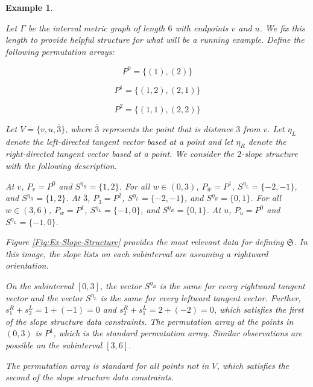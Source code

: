 \documentclass{amsart}
\newtheorem{varexample}[theorem]{Example}
\newenvironment{example}{\begin{varexample}
		\begin{normalfont}}{\end{normalfont}
\end{varexample}}
\begin{document}
	\begin{example}
		\label{Ex:slope-structure}
		Let $\Gamma$ be the interval metric graph of length $6$ with endpoints $v$ and $u$. We fix this length to provide helpful structure for what will be a running example. Define the following permutation arrays:
		
		$$P^0 = \{ (1), (2) \}$$
		
		$$P^1 = \{ (1,2), (2,1) \}$$
		
		$$P^2 = \{ (1,1), (2,2) \}$$
		
		Let $V = \{ v, u, \overline{3} \}$, where $\overline{3}$ represents the point that is distance $3$ from $v$. Let $\eta_{L}$ denote the left-directed tangent vector based at a point and let $\eta_{R}$ denote the right-directed tangent vector based at a point. We consider the $2$-slope structure with the following description.
		
		At $v$, $P_v = P^0$ and $S^{\eta_R} = \{1,2\}$. For all $w \in (0,3)$, $P_{\overline{w}} = P^1$, $S^{\eta_L} = \{-2,-1\}$, and $S^{\eta_R} = \{1,2\}$. At $\overline{3}$, $P_{\overline{3}} = P^2$, $S^{\eta_L} = \{-2,-1\}$, and $S^{\eta_R} = \{0,1\}$. For all $w \in (3,6)$, $P_{\overline{w}} = P^1$, $S^{\eta_L} = \{-1,0\}$, and $S^{\eta_R} = \{0,1\}$. At $u$, $P_u = P^0$ and $S^{\eta_L} = \{-1,0\}$.
		
		Figure \ref{Fig:Ex-Slope-Structure} provides the most relevant data for defining $\mathfrak{S}$. In this image, the slope lists on each subinterval are assuming a rightward orientation.
		
		On the subinterval $[0,3]$, the vector $S^{\eta_R}$ is the same for every rightward tangent vector and the vector $S^{\eta_L}$ is the same for every leftward tangent vector. Further, $s^R_1 + s^L_2 = 1 + (-1) = 0$ and $s^R_2 + s^L_1 = 2 + (-2) = 0$, which satisfies the first of the slope structure data constraints. The permutation array at the points in $(0,3)$ is $P^1$, which is the standard permutation array. Similar observations are possible on the subinterval $[3,6]$.
		
		The permutation array is standard for all points not in $V$, which satisfies the second of the slope structure data constraints.
	\end{example}
	
\end{document}
